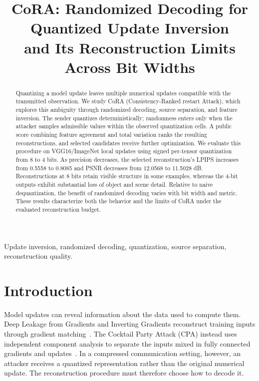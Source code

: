 \documentclass{article}
\title{CoRA: Randomized Decoding for Quantized Update Inversion\\
and Its Reconstruction Limits Across Bit Widths}
\newcommand{\cora}{CoRA}
\begin{document}
\maketitle

\begin{abstract}
Quantizing a model update leaves multiple numerical updates compatible with
the transmitted observation. We study \cora{} (Consistency-Ranked restart
Attack), which explores this ambiguity through randomized decoding,
source separation, and feature inversion. The sender quantizes
deterministically; randomness enters only when the attacker samples
admissible values within the observed quantization cells. A public score
combining feature agreement and total variation ranks the resulting
reconstructions, and selected candidates receive further optimization.
We evaluate this procedure on VGG16/ImageNet local updates using signed
per-tensor quantization from 8 to 4 bits. As precision decreases, the
selected reconstruction's LPIPS increases from 0.5558 to 0.8085 and PSNR
decreases from 12.0568 to 11.5028 dB. Reconstructions at 8 bits retain
visible structure in some examples, whereas the 4-bit outputs exhibit
substantial loss of object and scene detail. Relative to naive
dequantization, the benefit of randomized decoding varies with bit width
and metric. These results characterize both the behavior and the limits
of \cora{} under the evaluated reconstruction budget.
\end{abstract}

\begin{keywords}
Update inversion, randomized decoding,
quantization, source separation, reconstruction quality.
\end{keywords}

\section{Introduction}
\label{sec:intro}
Model updates can reveal information about the data used to compute them.
Deep Leakage from Gradients and Inverting Gradients reconstruct training
inputs through gradient matching~\cite{zhu2019deep,geiping2020inverting}.
The Cocktail Party Attack (CPA) instead uses
independent component analysis to separate the inputs mixed in fully
connected gradients and updates~\cite{kariyappa2023cocktail}.
In a compressed communication setting, however, an attacker receives a
quantized representation rather than the original numerical update.
The reconstruction procedure must therefore choose how to decode it.
\end{document}
